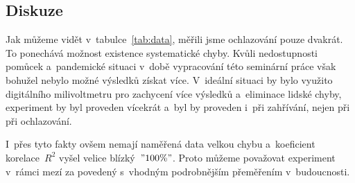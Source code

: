 \subsection{Diskuze}
Jak můžeme vidět v~tabulce~\ref{tab:data}, měřili jsme ochlazování pouze
dvakrát. To ponechává možnost existence systematické chyby. Kvůli nedostupnosti
pomůcek a~pandemické situaci v~době vypracování této seminární
práce však bohužel nebylo možné výsledků získat více. V~ideální situaci by bylo využito
digitálního milivoltmetru pro zachycení více výsledků a~eliminace lidské chyby,
experiment by byl proveden vícekrát a~byl by proveden i~při zahřívání, nejen při
při ochlazování.

I~přes tyto fakty ovšem nemají naměřená data velkou chybu a~koeficient
korelace~$R^2$ vyšel velice blízký~$"100 \%"$. Proto můžeme považovat
experiment v~rámci mezí za povedený s~vhodným podrobnějším přeměřením
v~budoucnosti.
